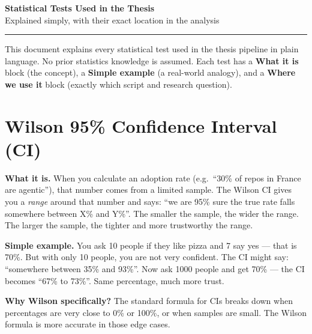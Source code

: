 \documentclass[11pt,a4paper]{article}
\begin{document}
\begin{center}
{\Large\bfseries\color{hdr} Statistical Tests Used in the Thesis}\\[4pt]
{\normalsize Explained simply, with their exact location in the analysis}
\end{center}
\vspace{-4pt}\hrule\vspace{10pt}

{\small This document explains every statistical test used in the thesis pipeline in plain language.
No prior statistics knowledge is assumed. Each test has a \textbf{What it is} block (the concept),
a \textbf{Simple example} (a real-world analogy), and a \textbf{Where we use it} block
(exactly which script and research question).}

\vspace{6pt}

\section{Wilson 95\% Confidence Interval (CI)}

\begin{conceptbox}
\textbf{What it is.}
When you calculate an adoption rate (e.g.\ ``30\% of repos in France are agentic''), that number
comes from a limited sample. The Wilson CI gives you a \emph{range} around that number and says:
``we are 95\% sure the true rate falls somewhere between X\% and Y\%''. The smaller the sample,
the wider the range. The larger the sample, the tighter and more trustworthy the range.

\medskip
\textbf{Simple example.}
You ask 10 people if they like pizza and 7 say yes --- that is 70\%. But with only 10 people,
you are not very confident. The CI might say: ``somewhere between 35\% and 93\%''. Now ask
1000 people and get 70\% --- the CI becomes ``67\% to 73\%''. Same percentage, much more trust.

\medskip
\textbf{Why Wilson specifically?}
The standard formula for CIs breaks down when percentages are very close to 0\% or 100\%,
or when samples are small. The Wilson formula is more accurate in those edge cases.
\end{conceptbox}
\end{document}
